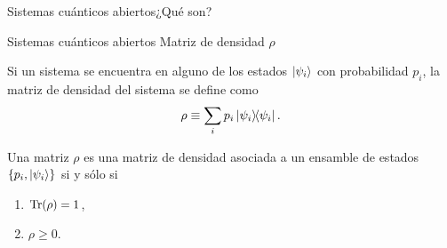 \documentclass[xcolor=dvipsnames,presentation]{beamer}%
\begin{document}
\begin{frame}{Sistemas cuánticos abiertos}{¿Qué son?}

  
\end{frame}


\begin{frame}{Sistemas cuánticos abiertos}%
  {Matriz de densidad $\rho$}\pause
  
  Si un sistema se encuentra en alguno de los estados $\ket{\psi_i}$ 
  con probabilidad $p_i$, la matriz de densidad del sistema se define como
  \begin{align*}
  \rho \equiv \sum_{i}p_i\dyad{\psi_i}{\psi_i}.
  \end{align*} \pause
  
  \vfill
  
	Una matriz $\rho$ es una matriz de densidad asociada 
	a un ensamble de estados $\{p_i,\ket{\psi_i}\}$ si y sólo si
	\begin{enumerate}
	\item $\Tr (\rho)=1$,
	\item $\rho\geq 0$.
	\end{enumerate}
	
	\vfill
\end{frame}
\end{document}
